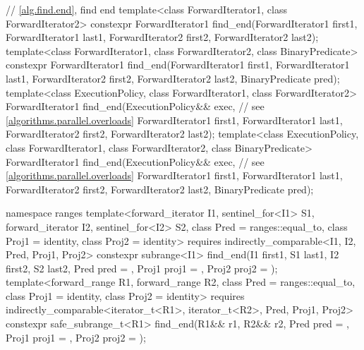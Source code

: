 \begin{codeblock}
{  // \ref{alg.find.end}, find end
  template<class ForwardIterator1, class ForwardIterator2>
    constexpr ForwardIterator1
      find_end(ForwardIterator1 first1, ForwardIterator1 last1,
               ForwardIterator2 first2, ForwardIterator2 last2);
  template<class ForwardIterator1, class ForwardIterator2, class BinaryPredicate>
    constexpr ForwardIterator1
      find_end(ForwardIterator1 first1, ForwardIterator1 last1,
               ForwardIterator2 first2, ForwardIterator2 last2,
               BinaryPredicate pred);
  template<class ExecutionPolicy, class ForwardIterator1, class ForwardIterator2>
    ForwardIterator1
      find_end(ExecutionPolicy&& exec,                          // see \ref{algorithms.parallel.overloads}
               ForwardIterator1 first1, ForwardIterator1 last1,
               ForwardIterator2 first2, ForwardIterator2 last2);
  template<class ExecutionPolicy, class ForwardIterator1,
           class ForwardIterator2, class BinaryPredicate>
    ForwardIterator1
      find_end(ExecutionPolicy&& exec,                          // see \ref{algorithms.parallel.overloads}
               ForwardIterator1 first1, ForwardIterator1 last1,
               ForwardIterator2 first2, ForwardIterator2 last2,
               BinaryPredicate pred);

  namespace ranges {
    template<forward_iterator I1, sentinel_for<I1> S1, forward_iterator I2, sentinel_for<I2> S2,
             class Pred = ranges::equal_to, class Proj1 = identity, class Proj2 = identity>
      requires indirectly_comparable<I1, I2, Pred, Proj1, Proj2>
      constexpr subrange<I1>
        find_end(I1 first1, S1 last1, I2 first2, S2 last2, Pred pred = {},
                 Proj1 proj1 = {}, Proj2 proj2 = {});
    template<forward_range R1, forward_range R2,
             class Pred = ranges::equal_to, class Proj1 = identity, class Proj2 = identity>
      requires indirectly_comparable<iterator_t<R1>, iterator_t<R2>, Pred, Proj1, Proj2>
      constexpr safe_subrange_t<R1>
        find_end(R1&& r1, R2&& r2, Pred pred = {},
                 Proj1 proj1 = {}, Proj2 proj2 = {});
  }

}
\end{codeblock}
